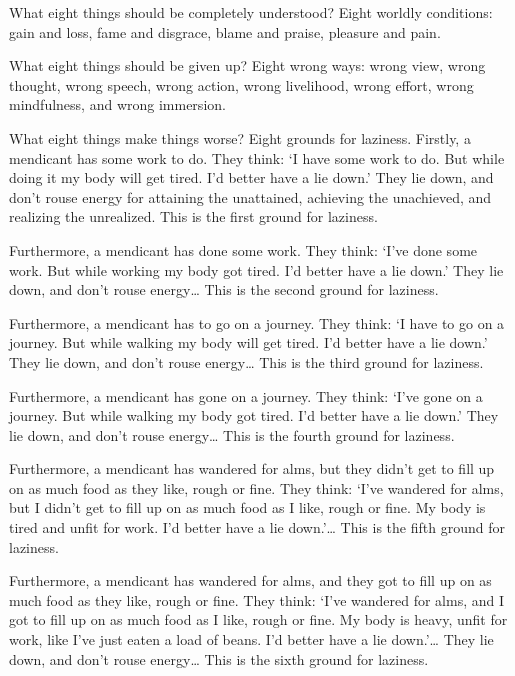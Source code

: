 \documentclass[12pt,openany]{book}%
\begin{document}
What eight things should be completely understood? Eight worldly conditions: gain and loss, fame and disgrace, blame and praise, pleasure and pain. 

What eight things should be given up? Eight wrong ways: wrong view, wrong thought, wrong speech, wrong action, wrong livelihood, wrong effort, wrong mindfulness, and wrong immersion. 

What eight things make things worse? Eight grounds for laziness. Firstly, a mendicant has some work to do. They think: ‘I have some work to do. But while doing it my body will get tired. I’d better have a lie down.’ They lie down, and don’t rouse energy for attaining the unattained, achieving the unachieved, and realizing the unrealized. This is the first ground for laziness. 

Furthermore, a mendicant has done some work. They think: ‘I’ve done some work. But while working my body got tired. I’d better have a lie down.’ They lie down, and don’t rouse energy… This is the second ground for laziness. 

Furthermore, a mendicant has to go on a journey. They think: ‘I have to go on a journey. But while walking my body will get tired. I’d better have a lie down.’ They lie down, and don’t rouse energy… This is the third ground for laziness. 

Furthermore, a mendicant has gone on a journey. They think: ‘I’ve gone on a journey. But while walking my body got tired. I’d better have a lie down.’ They lie down, and don’t rouse energy… This is the fourth ground for laziness. 

Furthermore, a mendicant has wandered for alms, but they didn’t get to fill up on as much food as they like, rough or fine. They think: ‘I’ve wandered for alms, but I didn’t get to fill up on as much food as I like, rough or fine. My body is tired and unfit for work. I’d better have a lie down.’… This is the fifth ground for laziness. 

Furthermore, a mendicant has wandered for alms, and they got to fill up on as much food as they like, rough or fine. They think: ‘I’ve wandered for alms, and I got to fill up on as much food as I like, rough or fine. My body is heavy, unfit for work, like I’ve just eaten a load of beans. I’d better have a lie down.’… They lie down, and don’t rouse energy… This is the sixth ground for laziness. 
\end{document}
